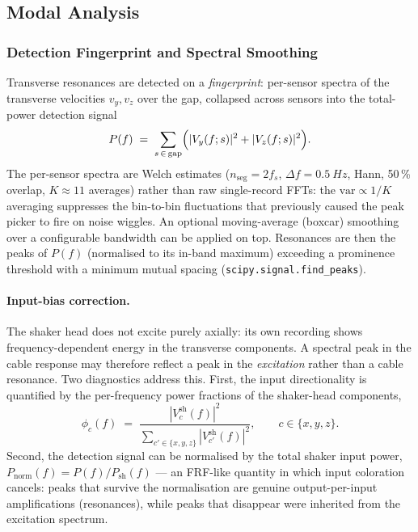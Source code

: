 \subsection{Modal Analysis}
\label{sec:proc:modal}

\subsubsection{Detection Fingerprint and Spectral Smoothing}
Transverse resonances are detected on a \emph{fingerprint}: per-sensor
spectra of the transverse velocities $v_y, v_z$ over the gap, collapsed
across sensors into the total-power detection signal
\begin{equation}
  P(f) \;=\; \sum_{s\,\in\,\mathrm{gap}}
      \Bigl( |V_y(f; s)|^2 + |V_z(f; s)|^2 \Bigr).
  \label{eq:fingerprint}
\end{equation}
The per-sensor spectra are Welch estimates
($n_\mathrm{seg} = 2 f_s$, $\Delta f = \SI{0.5}{Hz}$, Hann, 50\,\% overlap,
$K \approx 11$ averages) rather than raw single-record FFTs: the
$\mathrm{var} \propto 1/K$ averaging suppresses the bin-to-bin fluctuations
that previously caused the peak picker to fire on noise wiggles. An optional
moving-average (boxcar) smoothing over a configurable bandwidth can be
applied on top. Resonances are then the peaks of $P(f)$ (normalised to its
in-band maximum) exceeding a prominence threshold with a minimum mutual
spacing (\texttt{scipy.signal.find\_peaks}).

\paragraph{Input-bias correction.}
The shaker head does not excite purely axially: its own recording shows
frequency-dependent energy in the transverse components. A spectral peak in
the cable response may therefore reflect a peak in the \emph{excitation}
rather than a cable resonance. Two diagnostics address this. First, the
input directionality is quantified by the per-frequency power fractions of
the shaker-head components,
\begin{equation}
  \phi_c(f) \;=\; \frac{|V_c^\mathrm{sh}(f)|^2}
   {\sum_{c' \in \{x,y,z\}} |V_{c'}^\mathrm{sh}(f)|^2},
  \qquad c \in \{x, y, z\}.
  \label{eq:directionality}
\end{equation}
Second, the detection signal can be normalised by the total shaker input
power, $P_\mathrm{norm}(f) = P(f) / P_\mathrm{sh}(f)$ — an FRF-like quantity
in which input coloration cancels: peaks that survive the normalisation are
genuine output-per-input amplifications (resonances), while peaks that
disappear were inherited from the excitation spectrum.

